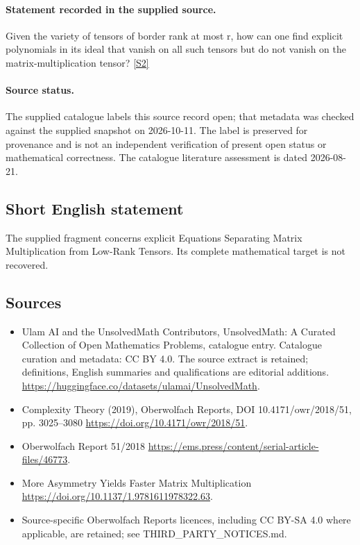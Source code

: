\documentclass[11pt]{article}
\begin{document}
\paragraph{Statement recorded in the supplied source.}
Given the variety of tensors of border rank at most r, how can one find explicit polynomials in its ideal that vanish on all such tensors but do not vanish on the matrix-multiplication tensor? \href{https://doi.org/10.4171/owr/2018/51}{[S2]}
\paragraph{Source status.}
The supplied catalogue labels this source record open; that metadata was checked against the supplied snapshot on 2026-10-11. The label is preserved for provenance and is not an independent verification of present open status or mathematical correctness. The catalogue literature assessment is dated 2026-08-21.
\subsection{Short English statement}
The supplied fragment concerns explicit Equations Separating Matrix Multiplication from Low-Rank Tensors. Its complete mathematical target is not recovered.
\subsection{Sources}
\begin{itemize}
\item[S1] Ulam AI and the UnsolvedMath Contributors, UnsolvedMath: A Curated Collection of Open Mathematics Problems, catalogue entry. Catalogue curation and metadata: CC BY 4.0. The source extract is retained; definitions, English summaries and qualifications are editorial additions.
\url{https://huggingface.co/datasets/ulamai/UnsolvedMath}.
\item[S2] Complexity Theory (2019), Oberwolfach Reports, DOI 10.4171/owr/2018/51, pp. 3025--3080
\url{https://doi.org/10.4171/owr/2018/51}.
\item[S3] Oberwolfach Report 51/2018
\url{https://ems.press/content/serial-article-files/46773}.
\item[S4] More Asymmetry Yields Faster Matrix Multiplication
\url{https://doi.org/10.1137/1.9781611978322.63}.
\item Source-specific Oberwolfach Reports licences, including CC BY-SA 4.0 where applicable, are retained; see THIRD\_PARTY\_NOTICES.md.
\end{itemize}
\end{document}
